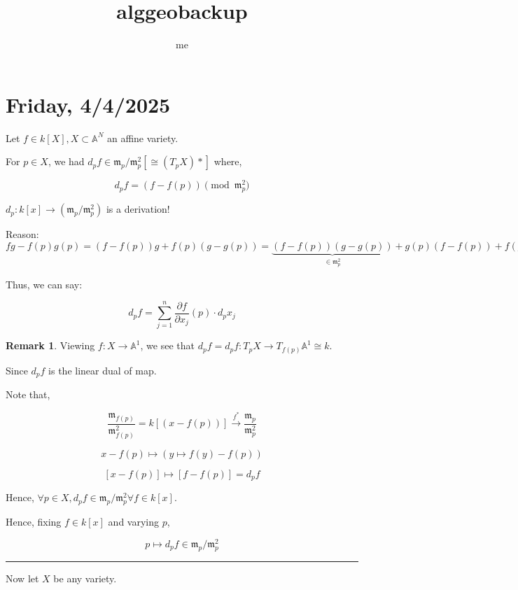\documentclass{article}
\title{alggeobackup}
\author{me}
\theoremstyle{definition}
\newtheorem*{remark}{Remark}
\begin{document}

    \section*{Friday, 4/4/2025}

    Let \(f\in k[X], X \subset \mathbb{A}^N\) an affine variety. 
    
    For \(p\in X\), we had \(d_p f \in \mathfrak{m}_p / \mathfrak{m}_p^2 [\cong (T_p X)\ast]\) where,

    \[
        d_p f = (f - f(p)) \pmod{\mathfrak{m}_p^2}
    \]

    \(d_p: k[x] \to (\mathfrak{m}_p / \mathfrak{m}_p^2)\) is a derivation!

    Reason: \(fg - f(p)g(p) = (f-f(p))g + f(p)(g-g(p)) = \underbrace{(f-f(p))(g-g(p))}_{\in \mathfrak{m}_p^2} + g(p)(f-f(p))+f(p)(g-g(p))\) 

    Thus, we can say:

    \[
        d_p f = \sum_{j=1}^n \frac{\partial f}{\partial x_j} (p) \cdot d_p x_j
    \]

    \begin{remark}
        Viewing \(f: X \to \mathbb{A}^1\), we see that \(d_p f = d_p f: T_p X \to T_{f(p)}\mathbb{A}^1 \cong k\).

        Since \(d_p f\) is the linear dual of map.

        Note that,

        \[
            \frac{\mathfrak{m}_{f(p)}}{\mathfrak{m}_{f(p)}^2} = k[(x-f(p))] \xrightarrow{f^{\ast}} \frac{\mathfrak{m}_p}{\mathfrak{m}_p^2}
        \]

        \[
            x - f(p) \mapsto (y \mapsto f(y) - f(p))
        \]

        \[
            [x-f(p)] \mapsto [f-f(p)] = d_p f
        \]


    \end{remark}

    Hence, \(\forall p\in X, d_p f \in \mathfrak{m}_p / \mathfrak{m}_p^2 \forall f\in k[x]\).
    
    Hence, fixing \(f\in k[x]\) and varying \(p\), 

    \[
        p \mapsto d_p f \in \mathfrak{m}_p / \mathfrak{m}_p^2
    \]

    \hrule

    Now let \(X\) be any variety.
\end{document}
